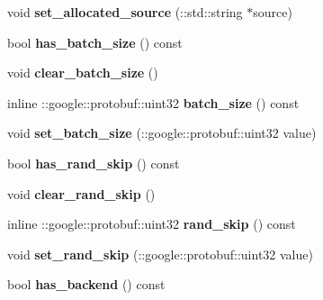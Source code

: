 \begin{DoxyCompactItemize}
void {\bfseries set\+\_\+allocated\+\_\+source} (\+::std\+::string $\ast$source)
\item 
\mbox{\label{classcaffe_1_1_data_parameter_a3e098f160d38ceb8b8d8b659baac4307}} 
bool {\bfseries has\+\_\+batch\+\_\+size} () const
\item 
\mbox{\label{classcaffe_1_1_data_parameter_ab71ac84e7230d5695e278a7b5fce45cf}} 
void {\bfseries clear\+\_\+batch\+\_\+size} ()
\item 
\mbox{\label{classcaffe_1_1_data_parameter_a3fb6b83d1166753a21fb281d0609430a}} 
inline \+::google\+::protobuf\+::uint32 {\bfseries batch\+\_\+size} () const
\item 
\mbox{\label{classcaffe_1_1_data_parameter_a71daeddbe2891937522010d289036468}} 
void {\bfseries set\+\_\+batch\+\_\+size} (\+::google\+::protobuf\+::uint32 value)
\item 
\mbox{\label{classcaffe_1_1_data_parameter_a3965cfa9cf11c1d495f90f8dd68615c6}} 
bool {\bfseries has\+\_\+rand\+\_\+skip} () const
\item 
\mbox{\label{classcaffe_1_1_data_parameter_a883298dcc281455776f73bb809e6df6d}} 
void {\bfseries clear\+\_\+rand\+\_\+skip} ()
\item 
\mbox{\label{classcaffe_1_1_data_parameter_af0f33f2e18094d787cf787748631c2a5}} 
inline \+::google\+::protobuf\+::uint32 {\bfseries rand\+\_\+skip} () const
\item 
\mbox{\label{classcaffe_1_1_data_parameter_a724edf3fdf8e348f733f5742c8a7e9a6}} 
void {\bfseries set\+\_\+rand\+\_\+skip} (\+::google\+::protobuf\+::uint32 value)
\item 
\mbox{\label{classcaffe_1_1_data_parameter_a69080bd627668faaf59082b57a7b0bc8}} 
bool {\bfseries has\+\_\+backend} () const
\item 
\mbox{\label{classcaffe_1_1_data_parameter_ae38f76f6683a557aeb69ca05ceb5d110}} 

\end{DoxyCompactItemize}
